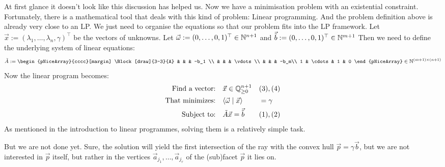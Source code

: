 At first glance it doesn't look like this discussion has helped us. Now we have a minimisation problem with an existential constraint. Fortunately, there is a mathematical tool that deals with this kind of problem: Linear programming. And the problem definition above is already very close to an LP. We just need to organise the equations so that our problem fits into the LP framework. Let $\vec x := (\lambda_1, \dots, \lambda_n, \gamma)^\top$ be the vectors of unknowns. Let $\vec\omega := (0, \dots, 0, 1)^\top \in \mathbb{N}^{n+1}$ and $\vec{\tilde b} := (0, \dots, 0, 1)^\top \in \mathbb{N}^{m+1}$ Then we need to define the underlying system of linear equations:
$$\tilde A :=
\begin{pNiceArray}{cccc}[margin] 
\Block[draw]{3-3}{A} & & & -b_1 \\
& & & \vdots\\
& & & -b_m\\
1 & \cdots  & 1 & 0 
\end{pNiceArray} \in \N^{(m+1) \times (n+1)}$$
Now the linear program becomes:
\begin{align*}
    \text{Find a vector:} & \quad \vec x \in \mathbb{Q}^{n+1}_{\geq 0} &&(3), (4)\\
    \text{That minimizes:} & \quad \langle \vec \omega \mid \vec x \rangle &&=\gamma\\
    \text{Subject to:} & \quad \tilde A\vec x = \vec{\tilde b} &&(1), (2)
\end{align*}
As mentioned in the introduction to linear programmes, solving them is a relatively simple task.

But we are not done yet. Sure, the solution will yield the first intersection of the ray with the convex hull $\vec p = \gamma\vec b$, but we are not interested in $\vec p$ itself, but rather in the vertices $\vec a_{j_1}, \dots, \vec a_{j_r}$ of the (sub)facet $\vec p$ it lies on. 


